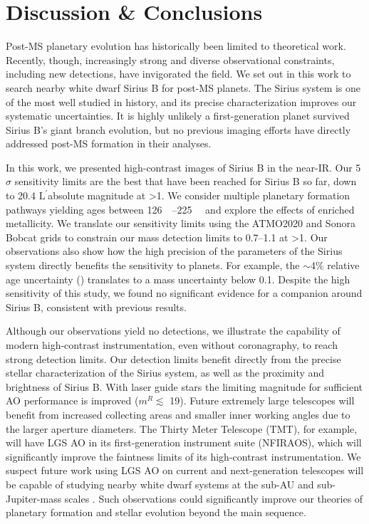 \documentclass[twocolumn,linenumbers]{aastex631}
\newcommand\Lp{$\mathrm{L}^\prime$}
\begin{document}
\section{Discussion \& Conclusions}\label{sec:conclusion}

Post-MS planetary evolution has historically been limited to theoretical work. Recently, though, increasingly strong and diverse observational constraints, including new detections, have invigorated the field. We set out in this work to search nearby white dwarf Sirius B for post-MS planets. The Sirius system is one of the most well studied in history, and its precise characterization improves our systematic uncertainties. It is highly unlikely a first-generation planet survived Sirius B's giant branch evolution, but no previous imaging efforts have directly addressed post-MS formation in their analyses.

In this work, we presented high-contrast images of Sirius B in the near-IR. Our 5$\sigma$ sensitivity limits are the best that have been reached for Sirius B so far, down to \num{20.4} \Lp absolute magnitude at \textgreater\qty{1}{\au}. We consider multiple planetary formation pathways yielding ages between \qtyrange{126}{225}{\mega\year} and explore the effects of enriched metallicity. We translate our sensitivity limits using the ATMO2020 and Sonora Bobcat grids to constrain our mass detection limits to \qtyrange{0.7}{1.1}{\jupitermass} at \textgreater\qty{1}{\au}. Our observations also show how the high precision of the parameters of the Sirius system directly benefits the sensitivity to planets. For example, the $\sim$4\% relative age uncertainty () translates to a mass uncertainty below \qty{0.1}{\jupitermass}. Despite the high sensitivity of this study, we found no significant evidence for a companion around Sirius B, consistent with previous results.

Although our observations yield no detections, we illustrate the capability of modern high-contrast instrumentation, even without coronagraphy, to reach strong detection limits. Our detection limits benefit directly from the precise stellar characterization of the Sirius system, as well as the proximity and brightness of Sirius B. With laser guide stars \citep[LGS; e.g.,][]{vandamKeckObservatoryLaser2006,baranecRoboAO2FacilityRapid2018} the limiting magnitude for sufficient AO performance is improved ($m^R\lesssim$ \num{19}). Future extremely large telescopes will benefit from increased collecting areas and smaller inner working angles due to the larger aperture diameters. The Thirty Meter Telescope (TMT), for example, will have LGS AO in its first-generation instrument suite (NFIRAOS), which will significantly improve the faintness limits of its high-contrast instrumentation. We suspect future work using LGS AO on current and next-generation telescopes will be capable of studying nearby white dwarf systems at the sub-AU and sub-Jupiter-mass scales \citep{holberg25ParsecLocal2016}. Such observations could significantly improve our theories of planetary formation and stellar evolution beyond the main sequence.
\end{document}
